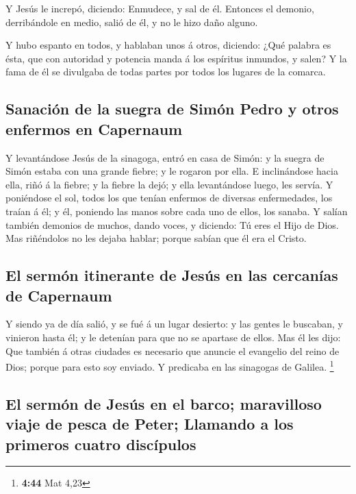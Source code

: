  Y Jesús le increpó, diciendo: Enmudece, y sal de él.
Entonces el demonio, derribándole en medio, salió de él, y no le hizo
daño alguno.

 Y hubo espanto en todos, y hablaban unos á otros,
diciendo: ¿Qué palabra es ésta, que con autoridad y potencia manda á los
espíritus inmundos, y salen?  Y la fama de él se divulgaba
de todas partes por todos los lugares de la comarca.

\hypertarget{sanaciuxf3n-de-la-suegra-de-simuxf3n-pedro-y-otros-enfermos-en-capernaum}{%
\subsection{Sanación de la suegra de Simón Pedro y otros enfermos en
Capernaum}\label{sanaciuxf3n-de-la-suegra-de-simuxf3n-pedro-y-otros-enfermos-en-capernaum}}

 Y levantándose Jesús de la sinagoga, entró en casa de
Simón: y la suegra de Simón estaba con una grande fiebre; y le rogaron
por ella.  E inclinándose hacia ella, riñó á la fiebre; y
la fiebre la dejó; y ella levantándose luego, les servía. 
Y poniéndose el sol, todos los que tenían enfermos de diversas
enfermedades, los traían á él; y él, poniendo las manos sobre cada uno
de ellos, los sanaba.  Y salían también demonios de muchos,
dando voces, y diciendo: Tú eres el Hijo de Dios. Mas riñéndolos no les
dejaba hablar; porque sabían que él era el Cristo.

\hypertarget{el-sermuxf3n-itinerante-de-jesuxfas-en-las-cercanuxedas-de-capernaum}{%
\subsection{El sermón itinerante de Jesús en las cercanías de
Capernaum}\label{el-sermuxf3n-itinerante-de-jesuxfas-en-las-cercanuxedas-de-capernaum}}

 Y siendo ya de día salió, y se fué á un lugar desierto: y
las gentes le buscaban, y vinieron hasta él; y le detenían para que no
se apartase de ellos.  Mas él les dijo: Que también á otras
ciudades es necesario que anuncie el evangelio del reino de Dios; porque
para esto soy enviado.  Y predicaba en las sinagogas de
Galilea. \footnote{\textbf{4:44} Mat 4,23}

\hypertarget{el-sermuxf3n-de-jesuxfas-en-el-barco-maravilloso-viaje-de-pesca-de-peter-llamando-a-los-primeros-cuatro-discuxedpulos}{%
\subsection{El sermón de Jesús en el barco; maravilloso viaje de pesca
de Peter; Llamando a los primeros cuatro
discípulos}\label{el-sermuxf3n-de-jesuxfas-en-el-barco-maravilloso-viaje-de-pesca-de-peter-llamando-a-los-primeros-cuatro-discuxedpulos}}

